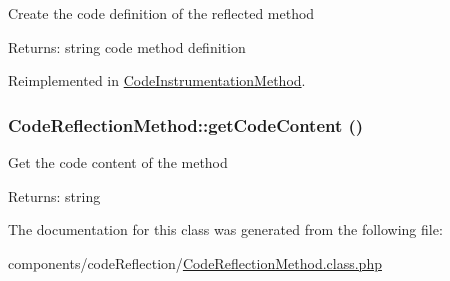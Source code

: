 Create the code definition of the reflected method

\begin{Desc}
\item[Returns:]string code method definition \end{Desc}


Reimplemented in \hyperlink{class_code_instrumentation_method_b79054196e5abf3e3464ad0551a9af71}{CodeInstrumentationMethod}.\hypertarget{class_code_reflection_method_49ef51345ba44d4a0c9242794f7a97a2}{
\subsubsection[{getCodeContent}]{\setlength{\rightskip}{0pt plus 5cm}CodeReflectionMethod::getCodeContent ()}}
\label{class_code_reflection_method_49ef51345ba44d4a0c9242794f7a97a2}


Get the code content of the method

\begin{Desc}
\item[Returns:]string \end{Desc}


The documentation for this class was generated from the following file:\begin{CompactItemize}
\item 
components/codeReflection/\hyperlink{_code_reflection_method_8class_8php}{CodeReflectionMethod.class.php}\end{CompactItemize}

